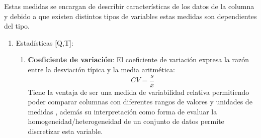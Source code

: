 \documentclass[a4paper,10pt,twocolumn]{article}
\begin{document}
			Estas medidas se encargan de describir caracter\'isticas de los datos de la columna 
			y debido a que existen distintos tipos de variables estas medidas son dependientes del tipo.
			\begin{enumerate}
				\item Estad\'isticas [Q,T]:
					\begin{enumerate}
						\item \textbf{Coeficiente de variaci\'on}: El coeficiente de variaci\'on expresa la raz\'on entre la desviaci\'on t\'ipica
						y la media aritm\'etica: $$CV = \frac{s}{\overline{x}}$$ Tiene la ventaja de ser una medida de variabilidad relativa permitiendo poder
						comparar columnas con diferentes rangos de valores y unidades de medidas \cite{mann2007introductory_cv}, adem\'as su interpretaci\'on como forma de evaluar
						la homogeneidad/heterogeneidad de un conjunto de datos permite discretizar esta variable.\\\\

\end{enumerate}
\end{enumerate}
\end{document}
